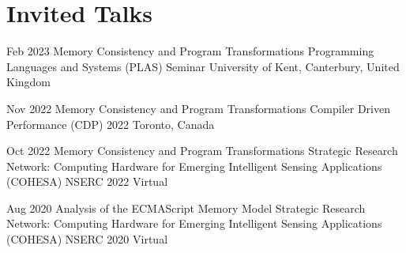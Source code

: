 \section{Invited Talks}

    \cventry
        {Feb 2023}
        {Memory Consistency and Program Transformations}
        {Programming Languages and Systems (PLAS) Seminar}
        {University of Kent, Canterbury, United Kingdom}
        {}
        {}

    \cventry
        {Nov 2022}
        {Memory Consistency and Program Transformations}
        {Compiler Driven Performance (CDP) 2022}
        {Toronto, Canada}
        {}
        {}

    \cventry
        {Oct 2022}
        {Memory Consistency and Program Transformations}
        {Strategic Research Network: Computing Hardware for Emerging Intelligent Sensing Applications (COHESA) NSERC 2022}
        {Virtual}
        {}
        {}

    \cventry
        {Aug 2020}
        {Analysis of the ECMAScript Memory Model}
        {Strategic Research Network: Computing Hardware for Emerging Intelligent Sensing Applications (COHESA) NSERC 2020}
        {Virtual}
        {}
        {}
